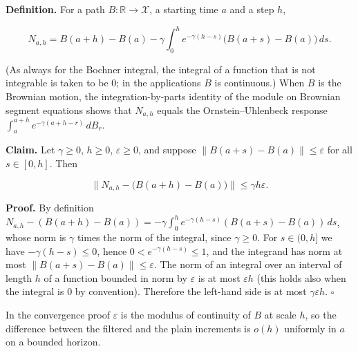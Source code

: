 \documentclass[11pt,a4paper]{article}
\begin{document}
\textbf{Definition.} For a path \(B:\mathbb R\to\mathcal X\), a starting time \(a\) and a step \(h\),


\[N_{a,h}=B(a+h)-B(a)-\gamma\int_0^he^{-\gamma(h-s)}\bigl(B(a+s)-B(a)\bigr)\,ds .\]


(As always for the Bochner integral, the integral of a function that is not integrable is taken to be \(0\); in the applications \(B\) is continuous.) When \(B\) is the Brownian motion, the integration-by-parts identity of the module on Brownian segment equations shows that \(N_{a,h}\) equals the Ornstein–Uhlenbeck response \(\int_a^{a+h}e^{-\gamma(a+h-r)}\,dB_r\).




\textbf{Claim.} Let \(\gamma\ge0\), \(h\ge0\), \(\varepsilon\ge0\), and suppose \(\|B(a+s)-B(a)\|\le\varepsilon\) for all \(s\in[0,h]\). Then


\[\bigl\|N_{a,h}-\bigl(B(a+h)-B(a)\bigr)\bigr\|\le\gamma h\varepsilon .\]


\textbf{Proof.} By definition \(N_{a,h}-(B(a+h)-B(a))=-\gamma\int_0^he^{-\gamma(h-s)}(B(a+s)-B(a))\,ds\), whose norm is \(\gamma\) times the norm of the integral, since \(\gamma\ge0\). For \(s\in(0,h]\) we have \(-\gamma(h-s)\le0\), hence \(0<e^{-\gamma(h-s)}\le1\), and the integrand has norm at most \(\|B(a+s)-B(a)\|\le\varepsilon\). The norm of an integral over an interval of length \(h\) of a function bounded in norm by \(\varepsilon\) is at most \(\varepsilon h\) (this holds also when the integral is \(0\) by convention). Therefore the left-hand side is at most \(\gamma\varepsilon h\). \(\square\)




In the convergence proof \(\varepsilon\) is the modulus of continuity of \(B\) at scale \(h\), so the difference between the filtered and the plain increments is \(o(h)\) uniformly in \(a\) on a bounded horizon.
\end{document}
